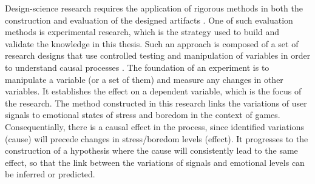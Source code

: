 
Design-science research requires the application of rigorous methods in both the construction and evaluation of the designed artifacts \parencite{hevner2004design, johannesson2014introduction, oates2005researching}. One of such evaluation methods is experimental research, which is the strategy used to build and validate the knowledge in this thesis. Such an approach is composed of a set of research designs that use controlled testing and manipulation of variables in order to understand causal processes \parencite{robson2016real}. The foundation of an experiment is to manipulate a variable (or a set of them) and measure any changes in other variables. It establishes the effect on a dependent variable, which is the focus of the research. The method constructed in this research links the variations of user signals to emotional states of stress and boredom in the context of games. Consequentially, there is a causal effect in the process, since identified variations (cause) will precede changes in stress/boredom levels (effect). It progresses to the construction of a hypothesis where the cause will consistently lead to the same effect, so that the link between the variations of signals and emotional levels can be inferred or predicted.

